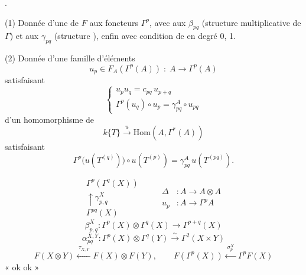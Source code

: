 \documentclass[11pt,a4paper]{article}
\begin{document}
  .

(1) Donnée d'une  de $F$ aux foncteurs $\Gamma^p$, avec  aux $\beta_{pq}$ (structure multiplicative de $\Gamma$) et aux $\gamma_{pq}$ (structure \ill{}), enfin avec condition de  en degré 0, 1.

(2) Donnée d'une famille d'éléments
\[
u_p \in F_A(\Gamma^p(A)) \;:\; A \to \Gamma^p(A)
\]
satisfaisant
\[
\begin{cases}
u_pu_q = c_{pq}\,u_{p+q} \\
\Gamma^p(u_q)\circ u_p = \gamma^A_{pq}\circ u_{pq}
\end{cases}
\]
\ill{} d'un homomorphisme \struck{\ill{}} de 
\[
k\{T\} \xrightarrow{\;u\;} \mathrm{Hom}(A,\Gamma^*(A))
\]
satisfaisant
\[
\Gamma^p\bigl(u(T^{(q)})\bigr)\circ u(T^{(p)}) = \gamma^A_{pq}\,u(T^{(pq)}).
\]

\[
\begin{array}{c}
\Gamma^p(\Gamma^q(X)) \\
\uparrow{\scriptstyle\gamma^X_{p,q}} \\
\Gamma^{pq}(X)
\end{array}
\qquad
\begin{aligned}
\Delta &: A \to A\otimes A \\
u_p &: A \to \Gamma^pA
\end{aligned}
\]
\[
\beta^X_{p,q} : \Gamma^p(X)\otimes\Gamma^q(X) \longrightarrow \Gamma^{p+q}(X)
\]
\[
\alpha^{X,Y}_{pq} : \Gamma^p(X)\otimes\Gamma^q(Y) \xrightarrow{\;\sim\;} \Gamma^{2}(X\times Y)
\]
\[
F(X\otimes Y) \xleftarrow{\;\tau_{X,Y}\;} F(X)\otimes F(Y), \qquad
F(\Gamma^p(X)) \xleftarrow{\;\sigma^X_p\;} \Gamma^pF(X)
\]
« ok ok »

\end{document}
